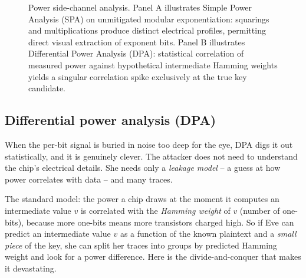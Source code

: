 \begin{figure}[H]
\caption{Power side-channel analysis. Panel A illustrates Simple Power Analysis (SPA) on unmitigated modular exponentiation: squarings and multiplications produce distinct electrical profiles, permitting direct visual extraction of exponent bits. Panel B illustrates Differential Power Analysis (DPA): statistical correlation of measured power against hypothetical intermediate Hamming weights yields a singular correlation spike exclusively at the true key candidate.}
\label{ch37:fig-power-analysis}
\end{figure}

\subsection{Differential power analysis (DPA)}
\label{ch37:dpa}

When the per-bit signal is buried in noise too deep for the eye, DPA digs it out statistically, and it is genuinely clever. The attacker does not need to understand the chip's electrical details. She needs only a \emph{leakage model} -- a guess at how power correlates with data -- and many traces.

The standard model: the power a chip draws at the moment it computes an intermediate value $v$ is correlated with the \emph{Hamming weight} of $v$ (number of one-bits), because more one-bits means more transistors charged high. So if Eve can predict an intermediate value $v$ as a function of the known plaintext and a \emph{small piece} of the key, she can split her traces into groups by predicted Hamming weight and look for a power difference. Here is the divide-and-conquer that makes it devastating.

